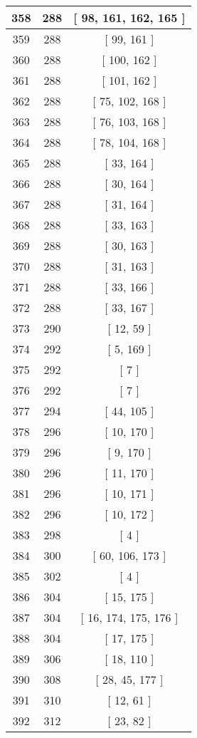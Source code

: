 \begin{center}
\begin{longtable}[H]{|| c c c ||}
\hline
358 & 288 & [ 98, 161, 162, 165 ] \\ 
\hline
359 & 288 & [ 99, 161 ] \\ 
\hline
360 & 288 & [ 100, 162 ] \\ 
\hline
361 & 288 & [ 101, 162 ] \\ 
\hline
362 & 288 & [ 75, 102, 168 ] \\ 
\hline
363 & 288 & [ 76, 103, 168 ] \\ 
\hline
364 & 288 & [ 78, 104, 168 ] \\ 
\hline
365 & 288 & [ 33, 164 ] \\ 
\hline
366 & 288 & [ 30, 164 ] \\ 
\hline
367 & 288 & [ 31, 164 ] \\ 
\hline
368 & 288 & [ 33, 163 ] \\ 
\hline
369 & 288 & [ 30, 163 ] \\ 
\hline
370 & 288 & [ 31, 163 ] \\ 
\hline
371 & 288 & [ 33, 166 ] \\ 
\hline
372 & 288 & [ 33, 167 ] \\ 
\hline
373 & 290 & [ 12, 59 ] \\ 
\hline
374 & 292 & [ 5, 169 ] \\ 
\hline
375 & 292 & [ 7 ] \\ 
\hline
376 & 292 & [ 7 ] \\ 
\hline
377 & 294 & [ 44, 105 ] \\ 
\hline
378 & 296 & [ 10, 170 ] \\ 
\hline
379 & 296 & [ 9, 170 ] \\ 
\hline
380 & 296 & [ 11, 170 ] \\ 
\hline
381 & 296 & [ 10, 171 ] \\ 
\hline
382 & 296 & [ 10, 172 ] \\ 
\hline
383 & 298 & [ 4 ] \\ 
\hline
384 & 300 & [ 60, 106, 173 ] \\ 
\hline
385 & 302 & [ 4 ] \\ 
\hline
386 & 304 & [ 15, 175 ] \\ 
\hline
387 & 304 & [ 16, 174, 175, 176 ] \\ 
\hline
388 & 304 & [ 17, 175 ] \\ 
\hline
389 & 306 & [ 18, 110 ] \\ 
\hline
390 & 308 & [ 28, 45, 177 ] \\ 
\hline
391 & 310 & [ 12, 61 ] \\ 
\hline
392 & 312 & [ 23, 82 ] \\ 

\end{longtable}
\end{center}
